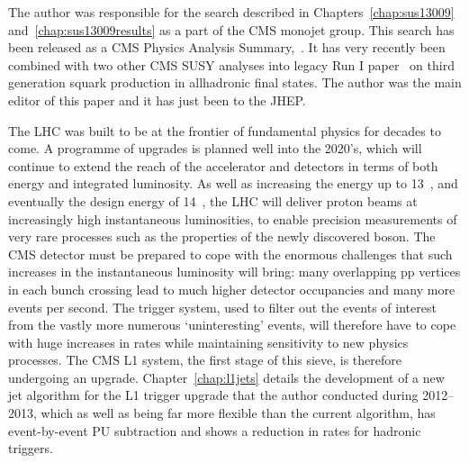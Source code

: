 The author was responsible for the search described in Chapters~\ref{chap:sus13009} and~\ref{chap:sus13009results} as a part of the CMS monojet group.
This search has been released as a CMS Physics Analysis Summary,~\cite{sus13009}. 
It has very recently been combined with two other CMS \ac{SUSY} analyses into  legacy Run I paper~\cite{sus14001} on third generation squark production in all\added{-}hadronic final states. 
The author was the main editor of this paper and it has just been  to the \ac{JHEP}.




The LHC was built to be at the frontier of fundamental physics for decades to come. 
A programme of upgrades is planned well into the 2020's, which will continue to extend the reach of the accelerator and detectors in terms of both energy and integrated luminosity. 
As well as increasing the energy up to 13~\TeV, and eventually the design energy of 14~\TeV, the LHC will deliver proton beams at increasingly high instantaneous luminosities, to enable precision measurements of very rare processes such as the properties of the newly discovered boson. 
The CMS detector must be prepared to cope with the enormous challenges that such increases in the instantaneous luminosity will bring: many overlapping pp vertices in each bunch crossing lead to much higher detector occupancies and many more events per second. 
The trigger system, used to filter out the events of interest from the vastly more numerous `uninteresting' events, will therefore have to cope with huge increases in rates while maintaining sensitivity to new physics processes. 
The CMS \ac{L1} system, the first stage of this sieve, is therefore undergoing an upgrade. 
Chapter~\ref{chap:l1jets} details the development of a new jet algorithm for the \ac{L1} trigger upgrade that the author conducted during 2012--2013, which as well as being far more flexible than the current algorithm, has event-by-event \ac{PU} subtraction and shows a reduction in rates for hadronic triggers.





